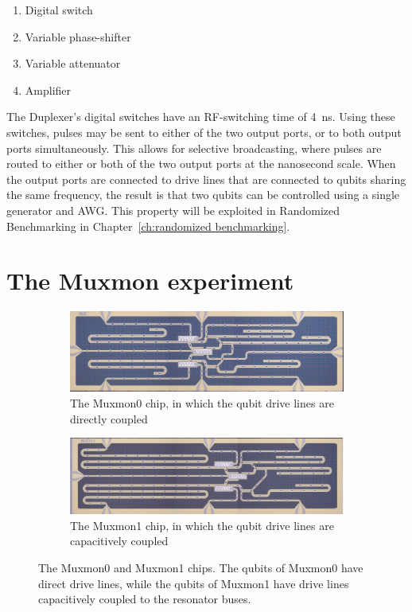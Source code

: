       \begin{enumerate}
        \item Digital switch
        \item Variable phase-shifter
        \item Variable attenuator
        \item Amplifier
      \end{enumerate}

      The Duplexer's digital switches have an RF-switching time of \SI{4}{\nano \second}. Using these switches, pulses may be sent to either of the two output ports, or to both output ports simultaneously. This allows for selective broadcasting, where pulses are routed to either or both of the two output ports at the nanosecond scale. When the output ports are connected to drive lines that are connected to qubits sharing the same frequency, the result is that two qubits can be controlled using a single generator and AWG. This property will be exploited in Randomized Benchmarking in Chapter~\ref{ch:randomized benchmarking}.

    \section{The Muxmon experiment}
      \label{sec: the Muxmon experiment}
      \begin{figure}[h]
      \centering
        \begin{subfigure}[b]{0.9\textwidth}
          \includegraphics[width=1\linewidth]{../Figures/MUX_0.jpg}
          \caption{The Muxmon0 chip, in which the qubit drive lines are directly coupled}
          \label{fig:Muxmon0 image}
        \end{subfigure}

        \begin{subfigure}[b]{0.9\textwidth}
          \includegraphics[width=1\linewidth]{../Figures/MUX_1.jpg}
          \caption{The Muxmon1 chip, in which the qubit drive lines are capacitively coupled}
          \label{fig:Muxmon1 image}
        \end{subfigure}
        \caption[Muxmon chips]{The Muxmon0 and Muxmon1 chips. The qubits of Muxmon0 have direct drive lines, while the qubits of Muxmon1 have drive lines capacitively coupled to the resonator buses.}
        \label{fig:Muxmon0 and Muxmon1}
      \end{figure}

